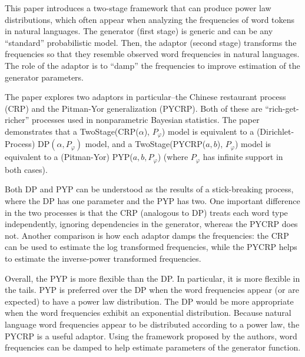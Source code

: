 \documentclass[12pt,letterpaper]{article}
\begin{document}

This paper introduces a two-stage framework that can produce power law distributions, which often appear when analyzing the frequencies of word tokens in natural languages. The generator (first stage) is generic and can be any ``standard'' probabilistic model. Then, the adaptor (second stage) transforms the frequencies so that they resemble observed word frequencies in natural languages. The role of the adaptor is to ``damp'' the frequencies to improve estimation of the generator parameters. 

The paper explores two adaptors in particular--the Chinese restaurant process (CRP) and the Pitman-Yor generalization (PYCRP). Both of these are ``rich-get-richer'' processes used in nonparametric Bayesian statistics. The paper demonstrates that a TwoStage(CRP($\alpha$), $P_\varphi$) model is equivalent to a (Dirichlet-Process) DP$(\alpha, P_\varphi)$ model, and a TwoStage(PYCRP($a,b$), $P_\varphi$) model is equivalent to a (Pitman-Yor) PYP($a,b,P_\varphi$) (where $P_\varphi$ has infinite support in both cases). 

Both DP and PYP can be understood as the results of a stick-breaking process, where the DP has one parameter and the PYP has two. One important difference in the two processes is that the CRP (analogous to DP) treats each word type independently, ignoring dependencies in the generator, whereas the PYCRP does not. Another comparison is how each adaptor damps the frequencies: the CRP can be used to estimate the log transformed frequencies, while the PYCRP helps to estimate the inverse-power transformed frequencies. %

Overall, the PYP is more flexible than the DP. In particular, it is more flexible in the tails. PYP is preferred over the DP when the word frequencies appear (or are expected) to have a power law distribution. The DP would be more appropriate when the word frequencies exhibit an exponential distribution. Because natural language word frequencies appear to be distributed according to a power law, the PYCRP is a useful adaptor. Using the framework proposed by the authors, word frequencies can be damped to help estimate parameters of the generator function. 

\end{document}
